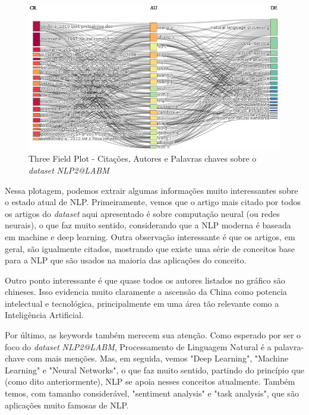  \begin{figure}
    \centering
    \includegraphics[width=1\textwidth]{experiments/ABMHub/PesquisaBibliometrica/NLP/tfp1.png}
    \caption{Three Field Plot - Citações, Autores e Palavras chaves sobre o \textit{dataset} \textit{NLP2@LABM}}
    \label{fig:ABMHub:TFP}
\end{figure}

Nessa plotagem, podemos extrair algumas informações muito interessantes sobre o estado atual de NLP. Primeiramente, vemos que o artigo mais citado por todos os artigos do \textit{dataset} aqui apresentado é sobre computação neural (ou redes neurais), o que faz muito sentido, considerando que a NLP moderna é baseada em machine e deep learning. Outra observação interessante é que os artigos, em geral, são igualmente citados, mostrando que existe uma série de conceitos base para a NLP que são usados na maioria das aplicações do conceito.

Outro ponto interessante é que quase todos os autores listados no gráfico são chineses. 
Isso evidencia muito claramente a ascensão da China como potencia intelectual e tecnológica, principalmente em uma área tão relevante como a Inteligência Artificial.

Por último, as keywords também merecem sua atenção. Como esperado por ser o foco do \textit{dataset} \textit{NLP2@LABM}, Processamento de Linguagem Natural é a palavra-chave com mais menções. Mas, em seguida, vemos "Deep Learning", "Machine Learning" e "Neural Networks", o que faz muito sentido, partindo do princípio que (como dito anteriormente), NLP se apoia nesses conceitos atualmente. Também temos, com tamanho considerável, "sentiment analysis" e "task analysis", que são aplicações muito famosas de NLP.

